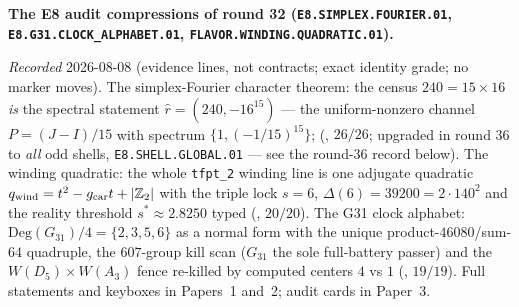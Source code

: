 \documentclass[11pt,a4paper]{article}
\newcommand{\gcar}{g_{\mathrm{car}}}
\newcommand{\Z}{\mathbb Z}
\begin{document}
\par\smallskip\noindent\textbf{The E8 audit compressions of
round 32 (\texttt{E8.SIMPLEX.FOURIER.01},
\texttt{E8.G31.CLOCK\_ALPHABET.01},
\texttt{FLAVOR.WINDING.QUADRATIC.01}).}
{\sloppy
\emph{Recorded} 2026-08-08 (evidence lines, not contracts;
exact identity grade; no marker moves).  The simplex-Fourier
character theorem: the census $240 = 15\times16$ \emph{is} the
spectral statement $\hat r = (240, -16^{15})$ --- the
uniform-nonzero channel $P = (J - I)/15$ with spectrum $\{1,
(-1/15)^{15}\}$; (, $26/26$; upgraded in
round 36 to \emph{all} odd shells, \texttt{E8.SHELL.GLOBAL.01}
--- see the round-36 record below).  The
winding quadratic: the whole \texttt{tfpt\_2} winding line is
one adjugate quadratic $q_{\rm wind} = t^2 - \gcar t + |\Z_2|$
with the triple lock $s = 6$, $\Delta(6) = 39200 = 2\cdot140^2$
and the reality threshold $s^* \approx 2.8250$ typed
(, $20/20$).  The G31
clock alphabet: $\mathrm{Deg}(G_{31})/4 = \{2,3,5,6\}$ as a
normal form with the unique product-$46080$/sum-$64$ quadruple,
the $607$-group kill scan ($G_{31}$ the sole full-battery
passer) and the $W(D_5)\times W(A_3)$ fence re-killed by
computed centers $4$ vs $1$
(, $19/19$).  Full
statements and keyboxes in Papers~1 and~2; audit cards in
Paper~3.\par}
\end{document}

